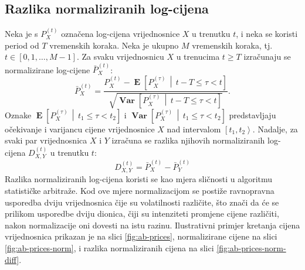 \documentclass[lmodern, utf8, diplomski, numeric]{fer}
\newcommand{\Efromto}[2]{\operatorname{\mathbf{E}}\q[#1\, \middle\vert\, #2\w]}
\newcommand{\Varfromto}[2]{\operatorname{\mathbf{Var}}\q[#1\, \middle\vert\, #2\w]}
\newcommand{\norm}[1]{\bar{#1}}
\newcommand{\q}{\left}
\newcommand{\w}{\right}
\begin{document}
  \subsection{Razlika normaliziranih log-cijena}
  Neka je s $P_X^{\q(t\w)}$ označena log-cijena vrijednosnice $X$ u trenutku $t$, i neka se koristi period od $T$ vremenskih koraka.
  Neka je ukupno $M$ vremenskih koraka, tj. $t \in \q[0, 1, \ldots, M - 1\w]$.
  Za svaku vrijednosnicu $X$ u trenucima $t \ge T$ izračunaju se normalizirane log-cijene $\norm{P}_X^{\q(t\w)}$:
  \begin{equation}
  \norm{P}_X^{\q(t\w)} = \frac{P_X^{\q(t\w)} - \Efromto{P_X^{(\tau)}}{t-T \le \tau < t}}{\sqrt{\Varfromto{P_X^{(\tau)}}{t-T \le \tau < t}}}.
  \end{equation}
  Oznake $\Efromto{P_X^{(\tau)}}{t_1 \le \tau < t_2}$ i $\Varfromto{P_X^{(\tau)}}{t_1 \le \tau < t_2}$ predstavljaju očekivanje i varijancu cijene vrijednosnice $X$ nad intervalom $\q[t_1, t_2\w\rangle$.
  Nadalje, za svaki par vrijednosnica $X$ i $Y$ izračuna se razlika njihovih normaliziranih log-cijena $D_{X,Y}^{\q(t\w)}$ u trenutku $t$:
  \begin{equation}
  D_{X,Y}^{\q(t\w)} = \norm{P}_X^{\q(t\w)} - \norm{P}_Y^{\q(t\w)}
  \end{equation}
  Razlika normaliziranih log-cijena koristi se kao mjera sličnosti u algoritmu statističke arbitraže.
  Kod ove mjere normalizacijom se postiže ravnopravna usporedba dviju vrijednosnica čije su volatilnosti različite, što znači da će se prilikom usporedbe dviju dionica, čiji su intenziteti promjene cijene različiti, nakon normalizacije oni dovesti na istu razinu.
  Ilustrativni primjer kretanja cijena vrijednosnica prikazan je na slici \ref{fig:ab-prices}, normalizirane cijene na slici \ref{fig:ab-prices-norm}, i razlika normaliziranih cijena na slici \ref{fig:ab-prices-norm-diff}.
  
\end{document}
